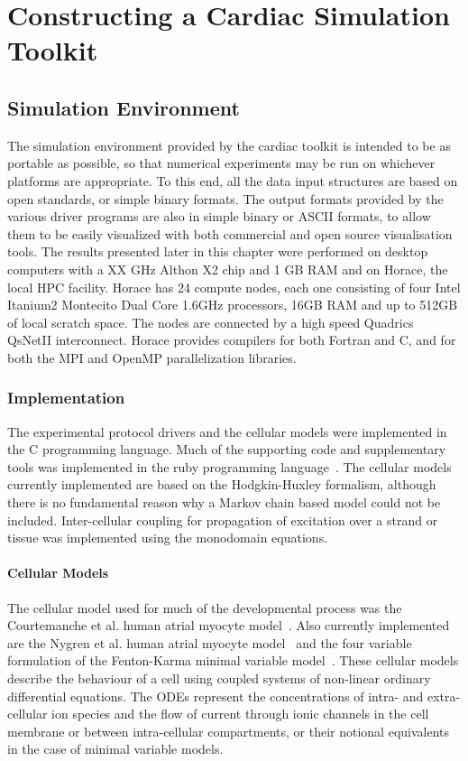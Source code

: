 \chapter{Constructing a Cardiac Simulation Toolkit}

\section{Simulation Environment}

The simulation environment provided by the cardiac toolkit is intended to be as
portable as possible, so that numerical experiments may be run on whichever
platforms are appropriate.  To this end, all the data input structures are based
on open standards, or simple binary formats.  The output formats provided by the
various driver programs are also in simple binary or ASCII formats, to allow
them to be easily visualized with both commercial and open source visualisation
tools.  The results presented later in this chapter were performed on desktop
computers with a XX GHz Althon X2 chip and 1 GB RAM and on Horace, the local HPC
facility.  Horace has 24 compute nodes, each one consisting of four Intel Itanium2
Montecito Dual Core 1.6GHz processors, 16GB RAM and up to 512GB of local scratch
space.  The nodes are connected by a high speed Quadrics QsNetII
interconnect.  Horace provides compilers for both Fortran and C,
and for both the MPI and OpenMP parallelization libraries.

\subsection{Implementation}

The experimental protocol drivers and the cellular models were implemented in
the C programming language.
Much of the supporting code and supplementary tools was implemented in the ruby
programming language~\cite{Flanagan2008}.
The cellular models currently implemented are based on the Hodgkin-Huxley
formalism, although there is no fundamental reason why a Markov chain based
model could not be included.
Inter-cellular coupling for propagation of excitation over a strand or tissue
was implemented using the monodomain equations.

\subsubsection{Cellular Models}

The cellular model used for much of the developmental process was the
Courtemanche et al. human atrial myocyte model~\cite{CRN98}.
Also currently implemented are the Nygren et al. human atrial myocyte
model~\cite{Nygren1998} and the four variable formulation of the Fenton-Karma
minimal variable model~\cite{Bueno-Orovio2008}.
These cellular models describe the behaviour of a cell using coupled systems of
non-linear ordinary differential equations.
The ODEs represent the concentrations of intra- and extra-cellular ion species
and the flow of current through ionic channels in the cell membrane or between
intra-cellular compartments, or their notional equivalents in the case of
minimal variable models.

